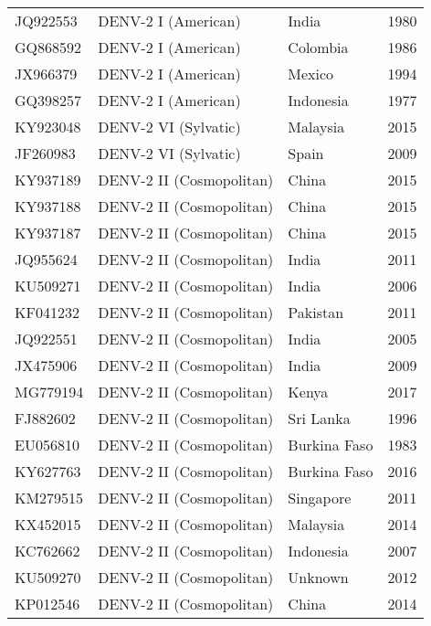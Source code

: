 \begin{longtable}{@{}llll@{}}
JQ922553 & DENV-2 I (American)        & India        & 1980            \\
GQ868592 & DENV-2 I (American)        & Colombia     & 1986            \\
JX966379 & DENV-2 I (American)        & Mexico       & 1994            \\
GQ398257 & DENV-2 I (American)        & Indonesia    & 1977            \\
KY923048 & DENV-2 VI (Sylvatic)       & Malaysia     & 2015            \\
JF260983 & DENV-2 VI (Sylvatic)       & Spain        & 2009            \\
KY937189 & DENV-2 II (Cosmopolitan)   & China        & 2015            \\
KY937188 & DENV-2 II (Cosmopolitan)   & China        & 2015            \\
KY937187 & DENV-2 II (Cosmopolitan)   & China        & 2015            \\
JQ955624 & DENV-2 II (Cosmopolitan)   & India        & 2011            \\
KU509271 & DENV-2 II (Cosmopolitan)   & India        & 2006            \\
KF041232 & DENV-2 II (Cosmopolitan)   & Pakistan     & 2011            \\
JQ922551 & DENV-2 II (Cosmopolitan)   & India        & 2005            \\
JX475906 & DENV-2 II (Cosmopolitan)   & India        & 2009            \\
MG779194 & DENV-2 II (Cosmopolitan)   & Kenya        & 2017            \\
FJ882602 & DENV-2 II (Cosmopolitan)   & Sri Lanka    & 1996            \\
EU056810 & DENV-2 II (Cosmopolitan)   & Burkina Faso & 1983            \\
KY627763 & DENV-2 II (Cosmopolitan)   & Burkina Faso & 2016            \\
KM279515 & DENV-2 II (Cosmopolitan)   & Singapore    & 2011            \\
KX452015 & DENV-2 II (Cosmopolitan)   & Malaysia     & 2014            \\
KC762662 & DENV-2 II (Cosmopolitan)   & Indonesia    & 2007            \\
KU509270 & DENV-2 II (Cosmopolitan)   & Unknown      & 2012            \\
KP012546 & DENV-2 II (Cosmopolitan)   & China        & 2014            \\

\end{longtable}
